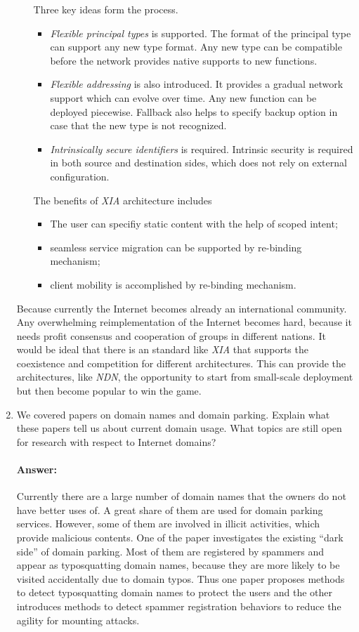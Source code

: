 \documentclass[a4paper,11pt]{article}
\theoremstyle{mytheor}
\begin{document}
\begin{enumerate}
\begin{itemize}
Three key ideas form the process.
\begin{itemize}
\item \emph{Flexible principal types} is supported. 
The format of the principal type can support any new type format.
Any new type can be compatible before the network provides native supports to new functions.
\item \emph{Flexible addressing} is also introduced.
It provides a gradual network support which can evolve over time.
Any new function can be deployed piecewise.
Fallback also helps to specify backup option in case that the new type is not recognized.
\item \emph{Intrinsically secure identifiers} is required. 
Intrinsic security is required in both source and destination sides, which does not rely on external configuration. 
\end{itemize}
The benefits of \emph{XIA} architecture includes
\begin{itemize}
	\item The user can specifiy static content with the help of scoped intent;
	\item seamless service migration can be supported by re-binding mechanism;
	\item client mobility is accomplished by re-binding mechanism.
\end{itemize}
\end{itemize}

Because currently the Internet becomes already an international community.
Any overwhelming reimplementation of the Internet becomes hard, because it needs profit consensus and cooperation of groups in different nations.
It would be ideal that there is an standard like \emph{XIA} that supports the coexistence and competition for different architectures.
This can provide the architectures, like \emph{NDN}, the opportunity to start from small-scale deployment but then become popular to win the game.

\item 
We covered papers on domain names and domain parking. 
Explain what these papers tell us about current domain usage. 
What topics are still open for research with respect to Internet domains?
\paragraph{Answer:}
Currently there are a large number of domain names that the owners do not have better uses of.
A great share of them are used for domain parking services.
However, some of them are involved in illicit activities, which provide malicious contents.
One of the paper investigates the existing ``dark side'' of domain parking.
Most of them are registered by spammers and appear as typosquatting domain names, because they are more likely to be visited accidentally due to domain typos.
Thus one paper proposes methods to detect typosquatting domain names to protect the users and the other introduces methods to detect spammer registration behaviors to reduce the agility for mounting attacks.


\end{enumerate}
\end{document}
